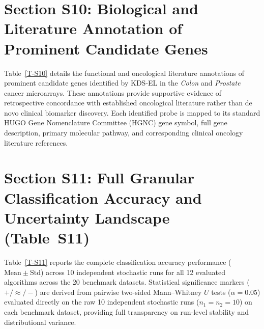 \documentclass[final,1p,times,fleqn]{elsarticle}
\begin{document}


\newpage

\section*{Section S10: Biological and Literature Annotation of Prominent Candidate Genes}\label{sec:supp_biomarkers}

Table~\ref{T-S10} details the functional and oncological literature annotations of prominent candidate genes identified by KDS-EL in the \textit{Colon} and \textit{Prostate} cancer microarrays. These annotations provide supportive evidence of retrospective concordance with established oncological literature rather than de novo clinical biomarker discovery. Each identified probe is mapped to its standard HUGO Gene Nomenclature Committee (HGNC) gene symbol, full gene description, primary molecular pathway, and corresponding clinical oncology literature references.



\newpage

\section*{Section S11: Full Granular Classification Accuracy and Uncertainty Landscape (Table~S11)}\label{sec:supp_full_acc}

Table~\ref{T-S11} reports the complete classification accuracy performance ($\mathrm{Mean} \pm \mathrm{Std}$) across 10 independent stochastic runs for all 12 evaluated algorithms across the 20 benchmark datasets. Statistical significance markers ($+ / \approx / -$) are derived from pairwise two-sided Mann--Whitney $U$ tests ($\alpha = 0.05$) evaluated directly on the raw 10 independent stochastic runs ($n_1 = n_2 = 10$) on each benchmark dataset, providing full transparency on run-level stability and distributional variance.





\end{document}
